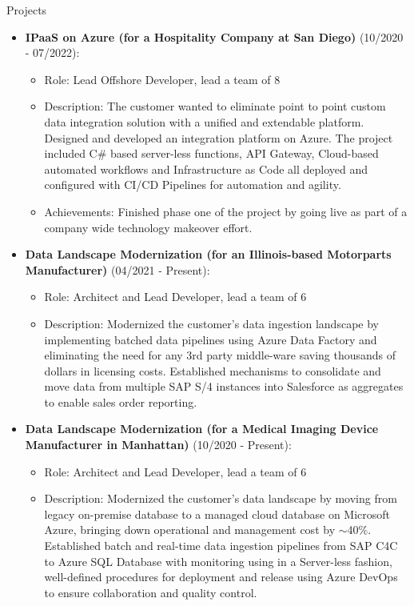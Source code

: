 \documentclass{resume} %
\begin{document}
\begin{rSection}{Projects}
        \begin{itemize}
            \item \textbf{IPaaS on Azure (for a Hospitality Company at San Diego)} (10/2020 - 07/2022):
            \begin{itemize}
                \item Role: Lead Offshore Developer, lead a team of 8
                \item Description: The customer wanted to eliminate point to point custom data integration solution with a unified and extendable platform. Designed and developed an integration platform on Azure. The project included C\# based server-less functions, API Gateway, Cloud-based automated workflows and Infrastructure as Code all deployed and configured with CI/CD Pipelines for automation and agility.
                \item Achievements: Finished phase one of the project by going live as part of a company wide technology makeover effort.
            \end{itemize}
        \end{itemize}

        \begin{itemize}
            \item \textbf{Data Landscape Modernization (for an Illinois-based Motorparts Manufacturer)} (04/2021 - Present):
            \begin{itemize}
                \item Role: Architect and Lead Developer, lead a team of 6
                \item Description: Modernized the customer's data ingestion landscape by implementing batched data pipelines using Azure Data Factory and eliminating the need for any 3rd party middle-ware saving thousands of dollars in licensing costs. Established mechanisms to consolidate and move data from multiple SAP S/4 instances into Salesforce as aggregates to enable sales order reporting.
            \end{itemize}
        \end{itemize}
        
        \begin{itemize}
            \item \textbf{Data Landscape Modernization (for a Medical Imaging Device Manufacturer in Manhattan)} (10/2020 - Present):
            \begin{itemize}
                \item Role: Architect and Lead Developer, lead a team of 6
                \item Description: Modernized the customer's data landscape by moving from legacy on-premise database to a managed cloud database on Microsoft Azure, bringing down operational and management cost by $\sim$40\%. Established batch and real-time data ingestion pipelines from SAP C4C to Azure SQL Database with monitoring using in a Server-less fashion, well-defined procedures for deployment and release using Azure DevOps to ensure collaboration and quality control.
            \end{itemize}
        \end{itemize}
        

\end{rSection}
\end{document}
